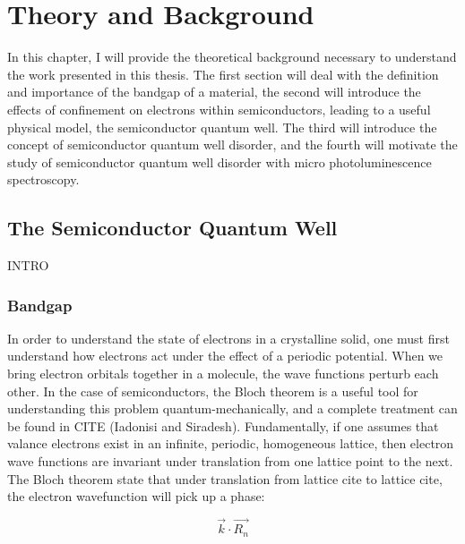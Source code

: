 \chapter{Theory and Background}
In this chapter, I will provide the theoretical background necessary to understand the work presented in this thesis. The first section will deal with the definition and importance of the bandgap of a material, the second will introduce the effects of confinement on electrons within semiconductors, leading to a useful physical model, the semiconductor quantum well. The third will introduce the concept of semiconductor quantum well disorder, and the fourth will motivate the study of semiconductor quantum well disorder with micro photoluminescence spectroscopy.

\section{The Semiconductor Quantum Well}
INTRO
\subsection{Bandgap}

\indent In order to understand the state of electrons in a crystalline solid, one must first understand how electrons act under the effect of a periodic potential. When we bring electron orbitals together in a molecule, the wave functions perturb each other. In the case of semiconductors, the Bloch theorem is a useful tool for understanding this problem quantum-mechanically, and a complete treatment can be found in CITE (Iadonisi and Siradesh). Fundamentally, if one assumes that valance electrons exist in an infinite, periodic, homogeneous lattice, then electron wave functions are invariant under translation from one lattice point to the next. The Bloch theorem state that under translation from lattice cite to lattice cite, the electron wavefunction will pick up a phase:

\begin{equation}
\vec{k}\cdot \vec{R_n}
\end{equation}
 
